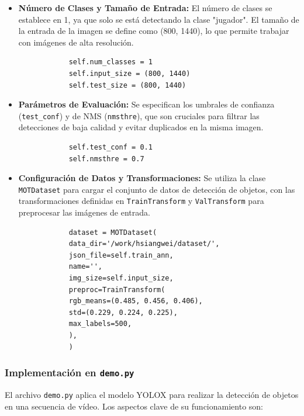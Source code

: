 \documentclass[12pt, a4paper, twoside]{article}
\begin{document}
	\begin{itemize}
		\item \textbf{Número de Clases y Tamaño de Entrada:} El número de clases se establece en 1, ya que solo se está detectando la clase "jugador". El tamaño de la entrada de la imagen se define como (800, 1440), lo que permite trabajar con imágenes de alta resolución.
		\begin{verbatim}
			self.num_classes = 1
			self.input_size = (800, 1440)
			self.test_size = (800, 1440)
		\end{verbatim}
		
		\item \textbf{Parámetros de Evaluación:} Se especifican los umbrales de confianza (\texttt{test\_conf}) y de NMS (\texttt{nmsthre}), que son cruciales para filtrar las detecciones de baja calidad y evitar duplicados en la misma imagen.
		\begin{verbatim}
			self.test_conf = 0.1
			self.nmsthre = 0.7
		\end{verbatim}
		
		\item \textbf{Configuración de Datos y Transformaciones:} Se utiliza la clase \texttt{MOTDataset} para cargar el conjunto de datos de detección de objetos, con las transformaciones definidas en \texttt{TrainTransform} y \texttt{ValTransform} para preprocesar las imágenes de entrada.
		\begin{verbatim}
			dataset = MOTDataset(
			data_dir='/work/hsiangwei/dataset/',
			json_file=self.train_ann,
			name='',
			img_size=self.input_size,
			preproc=TrainTransform(
			rgb_means=(0.485, 0.456, 0.406),
			std=(0.229, 0.224, 0.225),
			max_labels=500,
			),
			)
		\end{verbatim}
	\end{itemize}
	
	\subsubsection{Implementación en \texttt{demo.py}}
	
	El archivo \texttt{demo.py} aplica el modelo YOLOX para realizar la detección de objetos en una secuencia de vídeo. Los aspectos clave de su funcionamiento son:
	
\end{document}
